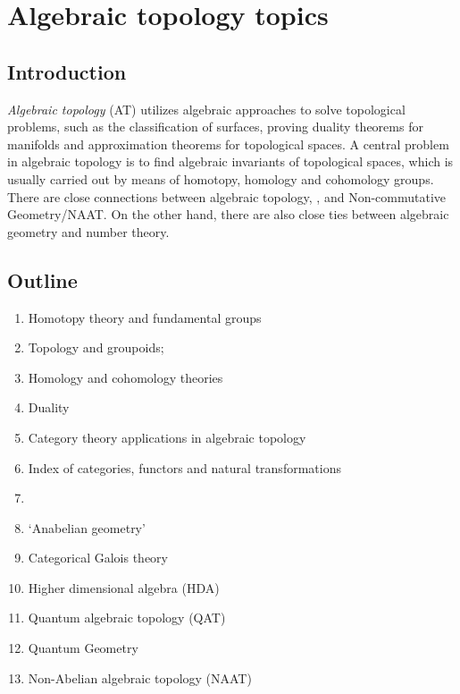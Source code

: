 \documentclass[12pt]{article}
\theoremstyle{plain}
\theoremstyle{definition}
\numberwithin{equation}{section}
\begin{document}
\section{Algebraic topology topics}


\subsection{Introduction}
\emph{Algebraic topology} (AT) utilizes algebraic approaches to solve topological problems,
such as the classification of surfaces, proving duality theorems for manifolds and 
approximation theorems for topological spaces. A central problem in algebraic topology 
is to find algebraic invariants of topological spaces, which is usually carried out by means
of homotopy, homology and cohomology groups. There are close connections between algebraic topology, 
, and Non-commutative Geometry/NAAT. On the other hand, there are also close ties between algebraic geometry and number 
theory. 


\subsection{Outline}
\begin{enumerate}

\item Homotopy theory and fundamental groups
\item Topology and groupoids;  
\item Homology and cohomology theories
\item Duality
\item Category theory applications in algebraic topology
\item Index of categories, functors and natural transformations
\item {}
\item `Anabelian geometry'
\item Categorical Galois theory
\item Higher dimensional algebra (HDA)
\item Quantum algebraic topology (QAT)
\item Quantum Geometry
\item Non-Abelian algebraic topology (NAAT)
\end{enumerate}
\end{document}
